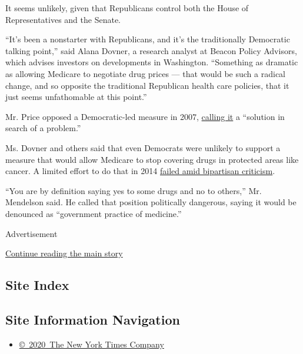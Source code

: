 It seems unlikely, given that Republicans control both the House of
Representatives and the Senate.

``It's been a nonstarter with Republicans, and it's the traditionally
Democratic talking point,'' said Alana Dovner, a research analyst at
Beacon Policy Advisors, which advises investors on developments in
Washington. ``Something as dramatic as allowing Medicare to negotiate
drug prices --- that would be such a radical change, and so opposite the
traditional Republican health care policies, that it just seems
unfathomable at this point.''

Mr. Price opposed a Democratic-led measure in 2007,
\href{http://www.nytimes.com/2007/01/12/washington/12cnd-drug.html}{calling
it} a ``solution in search of a problem.''

Ms. Dovner and others said that even Democrats were unlikely to support
a measure that would allow Medicare to stop covering drugs in protected
areas like cancer. A limited effort to do that in 2014
\href{https://www.nytimes.com/2014/02/22/business/plan-to-alter-medicare-drug-coverage-draws-strong-opposition.html}{failed
amid bipartisan criticism}.

``You are by definition saying yes to some drugs and no to others,'' Mr.
Mendelson said. He called that position politically dangerous, saying it
would be denounced as ``government practice of medicine.''

Advertisement

\protect\hyperlink{after-bottom}{Continue reading the main story}

\hypertarget{site-index}{%
\subsection{Site Index}\label{site-index}}

\hypertarget{site-information-navigation}{%
\subsection{Site Information
Navigation}\label{site-information-navigation}}

\begin{itemize}
\tightlist
\item
  \href{https://help.nytimes.com/hc/en-us/articles/115014792127-Copyright-notice}{©~2020~The
  New York Times Company}
\end{itemize}

